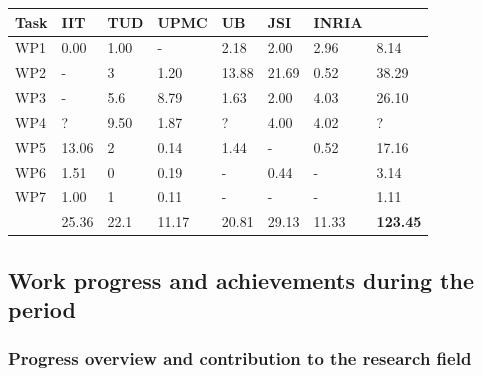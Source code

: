 \documentclass[12pt,a4paper,twoside]{article}
\begin{document}
\begin{longtable}{|C{1.5cm}|C{1.5cm}|C{1.5cm}|C{1.5cm}|C{1.5cm}|C{1.5cm}|C{1.5cm}|C{1.5cm}|}
\footnotesize \textbf{Task}& \footnotesize \textbf{IIT}&\footnotesize \textbf{TUD}&\footnotesize \textbf{UPMC}& \footnotesize \textbf{UB} &\footnotesize \textbf{JSI} &\footnotesize \textbf{INRIA} &  \\ \hline
\footnotesize WP1      &  0.00     &  1.00   &  -      &  2.18   &  2.00  &  2.96  &  8.14 \\  \hline
\footnotesize WP2      &  -        &  3      &  1.20   &  13.88  &  21.69 &  0.52  &  38.29\\  \hline
\footnotesize WP3      &  -        &  5.6   &  8.79   &  1.63   &  2.00  &  4.03  &  26.10\\  \hline
\footnotesize WP4      &  ?     &  9.50     &  1.87   &  ?   &  4.00  &  4.02  &  ?\\  \hline
\footnotesize WP5      &  13.06    &  2      &  0.14   &  1.44   &  -     &  0.52  &  17.16\\  \hline
\footnotesize WP6      &  1.51     &  0      &  0.19   &  -      &  0.44  &  -     &   3.14\\  \hline
\footnotesize WP7      &  1.00     &  1      &  0.11   &  -      &  -     &  -     &   1.11\\  \hline
{}  &  25.36    &  22.1  &  11.17  &  20.81  &  29.13 &  11.33 &  \textbf{123.45}     \\  
\end{longtable}











\subsection{Work progress and achievements during the period}

\subsubsection{Progress overview and contribution to the research field}
\end{document}
